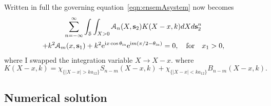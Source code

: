 \documentclass[12pt, a4paper]{article}
\begin{document}
Written in full the governing equation~\eqref{eqn:ensemAsystem} now becomes
\begin{multline}
 \sum_{n=-\infty}^\infty \int_\mathcal S
  \int_{X> 0} \mathcal A_n (X, \mathbf s_2) K(X - x,k) dX
  d\mathbf s_2^n
\\
+  k^2 \mathcal A_m (x, \mathbf s_1)   + k^2  \textrm{e}^{\textrm{i} x \cos \theta_{\mathrm{in}}} \textrm{e}^{\textrm{i} m ( \pi/2 - \theta_{\mathrm{in}} )}
   = 0, \quad \text{for} \quad x_1 >0,
  \label{eqn:ensemAsystem2}
\end{multline}
where I swapped the integration variable $X \to X - x$.
where
\begin{equation}
K(X-x,k) =   \chi_{\{ |X-x|> k a_{12}\}}  S_{n-m}(X-x,k)
 + \chi_{\{ |X - x|< k a_{12}\}}   B_{n-m}(X- x,k).
\label{eqn:kernel}
\end{equation}
\subsection{Numerical solution}
\label{sec:numerical}
\end{document}
